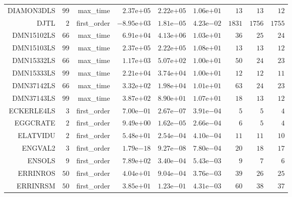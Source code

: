 \begin{longtable}{rrrrrrrrr}
DIAMON3DLS & \(    99\) & max\_time & \( 2.37\)e\(+05\) & \( 2.22\)e\(+05\) & \( 1.06\)e\(+01\) & \(    13\) & \(    13\) & \(    12\) \\
DJTL & \(     2\) & first\_order & \(-8.95\)e\(+03\) & \( 1.81\)e\(-05\) & \( 4.23\)e\(-02\) & \(  1831\) & \(  1756\) & \(  1755\) \\
DMN15102LS & \(    66\) & max\_time & \( 6.91\)e\(+04\) & \( 4.13\)e\(+06\) & \( 1.03\)e\(+01\) & \(    36\) & \(    25\) & \(    24\) \\
DMN15103LS & \(    99\) & max\_time & \( 2.37\)e\(+05\) & \( 2.22\)e\(+05\) & \( 1.08\)e\(+01\) & \(    13\) & \(    13\) & \(    12\) \\
DMN15332LS & \(    66\) & max\_time & \( 1.17\)e\(+03\) & \( 5.07\)e\(+02\) & \( 1.00\)e\(+01\) & \(    50\) & \(    24\) & \(    23\) \\
DMN15333LS & \(    99\) & max\_time & \( 2.21\)e\(+04\) & \( 3.74\)e\(+04\) & \( 1.00\)e\(+01\) & \(    12\) & \(    12\) & \(    11\) \\
DMN37142LS & \(    66\) & max\_time & \( 3.32\)e\(+02\) & \( 1.98\)e\(+04\) & \( 1.01\)e\(+01\) & \(    63\) & \(    24\) & \(    23\) \\
DMN37143LS & \(    99\) & max\_time & \( 3.87\)e\(+02\) & \( 8.90\)e\(+01\) & \( 1.07\)e\(+01\) & \(    18\) & \(    13\) & \(    12\) \\
ECKERLE4LS & \(     3\) & first\_order & \( 7.00\)e\(-01\) & \( 2.67\)e\(-07\) & \( 3.91\)e\(-04\) & \(     5\) & \(     5\) & \(     4\) \\
EGGCRATE & \(     2\) & first\_order & \( 9.49\)e\(+00\) & \( 1.62\)e\(-05\) & \( 2.66\)e\(-04\) & \(     6\) & \(     5\) & \(     4\) \\
ELATVIDU & \(     2\) & first\_order & \( 5.48\)e\(+01\) & \( 2.54\)e\(-04\) & \( 4.10\)e\(-04\) & \(    11\) & \(    11\) & \(    10\) \\
ENGVAL2 & \(     3\) & first\_order & \( 1.79\)e\(-18\) & \( 9.27\)e\(-08\) & \( 7.80\)e\(-04\) & \(    20\) & \(    18\) & \(    17\) \\
ENSOLS & \(     9\) & first\_order & \( 7.89\)e\(+02\) & \( 3.40\)e\(-04\) & \( 5.43\)e\(-03\) & \(     9\) & \(     7\) & \(     6\) \\
ERRINROS & \(    50\) & first\_order & \( 4.04\)e\(+01\) & \( 9.04\)e\(-04\) & \( 3.76\)e\(-03\) & \(    39\) & \(    26\) & \(    25\) \\
ERRINRSM & \(    50\) & first\_order & \( 3.85\)e\(+01\) & \( 1.23\)e\(-01\) & \( 4.31\)e\(-03\) & \(    60\) & \(    38\) & \(    37\) \\

\end{longtable}
